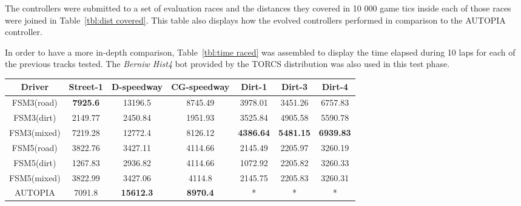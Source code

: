 	The controllers were submitted to a set of evaluation races and the distances they covered in 10 000 game tics inside each of those races were joined in Table~\ref{tbl:dist covered}. This table also displays how the evolved controllers performed in comparison to the AUTOPIA controller.
	
	In order to have a more in-depth comparison, Table~\ref{tbl:time raced} was assembled to display the time elapsed during 10 laps for each of the previous tracks tested. The \textit{Berniw Hist4} bot provided by the TORCS distribution was also used in this test phase.
	
	\begin{table*}[t]
	\renewcommand{\arraystretch}{1.3}
	\caption{Distance covered in meters racing alone for 10 000 game tics}
	\label{tbl:dist covered}
	\centering
	\begin{tabular}{c||c||c||c||c||c||c}
	\hline
	\bfseries Driver & \bfseries Street-1 & \bfseries D-speedway & \bfseries CG-speedway & \bfseries Dirt-1 & \bfseries Dirt-3 & \bfseries Dirt-4 \\ 
	\hline	
	\hline FSM3(road) & \textbf{7925.6} & 13196.5 & 8745.49 & 3978.01 & 3451.26 & 6757.83 \\
	\hline FSM3(dirt) & 2149.77	& 2450.84 & 1951.93	& 3525.84 & 4905.58 & 5590.78 \\
	\hline FSM3(mixed) & 7219.28 & 12772.4 & 8126.12 & \textbf{4386.64} & \textbf{5481.15} & \textbf{6939.83} \\
	\hline FSM5(road) & 3822.76 & 3427.11 & 4114.66	& 2145.49 &	2205.97 & 3260.19 \\
	\hline FSM5(dirt) & 1267.83 & 2936.82 &	4114.66 & 1072.92 &	2205.82 & 3260.33 \\
	\hline FSM5(mixed) & 3822.99 & 3427.06 & 4114.8 & 2145.75 &	2205.83 & 3260.31 \\
	\hline AUTOPIA & 7091.8 & \textbf{15612.3} & \textbf{8970.4} & * & * & * \\
	\hline 
	\end{tabular} 
	\end{table*}

